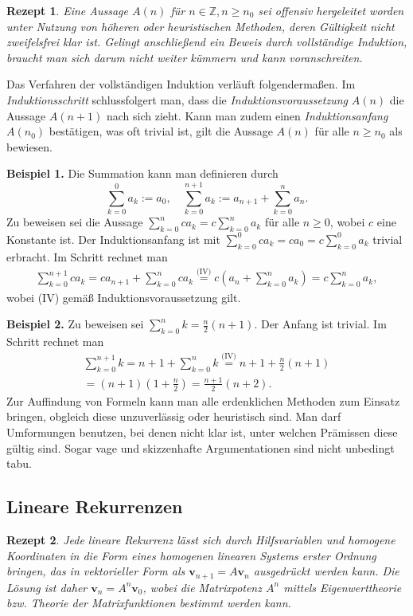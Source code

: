 \documentclass[a4paper,10pt,fleqn,twocolumn,twoside,dvipdfmx]{scrartcl}
\theoremstyle{rmbox}
\newtheorem{Rezept}{Rezept}[section]
\newcommand{\strong}[1]{\textsf{\textbf{#1}}}
\newcommand{\Z}{\mathbb Z}
\begin{document}
\begin{Rezept}
Eine Aussage $A(n)$ für $n\in\Z, n\ge n_0$ sei offensiv
hergeleitet worden unter Nutzung von höheren oder
heuristischen Methoden, deren Gültigkeit nicht zweifelsfrei
klar ist. Gelingt anschließend ein Beweis durch vollständige
Induktion, braucht man sich darum nicht weiter kümmern
und kann voranschreiten.
\end{Rezept}
Das Verfahren der vollständigen Induktion verläuft folgendermaßen.
Im \emph{Induktionsschritt} schlussfolgert man, dass die
\emph{Induktionsvoraussetzung} $A(n)$ die Aussage $A(n+1)$ nach sich
zieht. Kann man zudem einen \emph{Induktionsanfang}
$A(n_0)$ bestätigen, was oft trivial ist, gilt die Aussage $A(n)$
für alle $n\ge n_0$ als bewiesen.

\strong{Beispiel 1.} Die Summation kann man definieren durch%
\[\sum_{k=0}^0 a_k := a_0,\quad
\sum_{k=0}^{n+1} a_k := a_{n+1}+\sum_{k=0}^n a_n.
\]
Zu beweisen sei die Aussage $\sum_{k=0}^n ca_k = c\sum_{k=0}^n a_k$
für alle $n\ge 0$, wobei
$c$ eine Konstante ist. Der Induktionsanfang ist mit
$\sum_{k=0}^0 ca_k = ca_0 = c\sum_{k=0}^0 a_k$
trivial erbracht. Im Schritt rechnet man%
\begin{gather*}
\sum_{k=0}^{n+1} ca_k = ca_{n+1}+\sum_{k=0}^n ca_k
\!\!\stackrel{\text{(IV)}}=\! c(a_n + \sum_{k=0}^n a_k)
= c\!\sum_{k=0}^n a_k,
\end{gather*}
wobei (IV) gemäß Induktionsvoraussetzung gilt.

\strong{Beispiel 2.} Zu beweisen sei $\sum_{k=0}^n k = \tfrac{n}{2}(n+1)$.
Der Anfang ist trivial. Im Schritt rechnet man
\begin{gather*}
\sum_{k=0}^{n+1} k = n+1+\sum_{k=0}^n k
\stackrel{\text{(IV)}} = n+1+\tfrac{n}{2}(n+1)\\
= (n+1)(1+\tfrac{n}{2})
= \tfrac{n+1}{2}(n+2).
\end{gather*}
Zur Auffindung von Formeln kann man alle erdenklichen Methoden
zum Einsatz bringen, obgleich diese unzuverlässig oder heuristisch
sind. Man darf Umformungen benutzen, bei denen nicht klar ist,
unter welchen Prämissen diese gültig sind. Sogar vage und skizzenhafte
Argumentationen sind nicht unbedingt tabu.

\subsection{Lineare Rekurrenzen}

\begin{Rezept}
Jede lineare Rekurrenz lässt sich durch Hilfsvariablen und homogene
Koordinaten in die Form eines homogenen linearen Systems erster Ordnung
bringen, das in vektorieller Form als $\mathbf v_{n+1}=A\mathbf v_n$
ausgedrückt werden kann. Die Lösung ist daher
$\mathbf v_n = A^n\mathbf v_0$, wobei die Matrixpotenz $A^n$ mittels
Eigenwerttheorie bzw. Theorie der Matrixfunktionen bestimmt werden
kann.
\end{Rezept}
\end{document}
